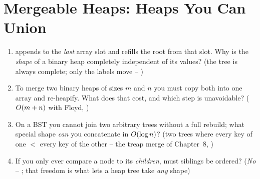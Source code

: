 \section{Mergeable Heaps: Heaps You Can Union}\label{sec:c07-trees}

\begin{previouslybox}
\begin{enumerate}[nosep, leftmargin=1.6em]
  \item {} appends to the \emph{last} array slot and  refills the root from that slot.
        Why is the \emph{shape} of a binary heap completely independent of its values? (the tree is always
        complete; only the labels move -- )
  \item To merge two binary heaps of sizes $m$ and $n$ you must copy both into one array and re-heapify.
        What does that cost, and which step is unavoidable? ($O(m+n)$ with Floyd, )
  \item On a BST you cannot join two arbitrary trees without a full rebuild; what special shape \emph{can}
        you concatenate in $O(\log n)$? (two trees where every key of one $<$ every key of the other --
        the treap merge of Chapter~8, )
  \item If you only ever compare a node to its \emph{children}, must siblings be ordered? (\emph{No} --
        ; that freedom is what lets a heap tree take \emph{any} shape)
\end{enumerate}
\end{previouslybox}

